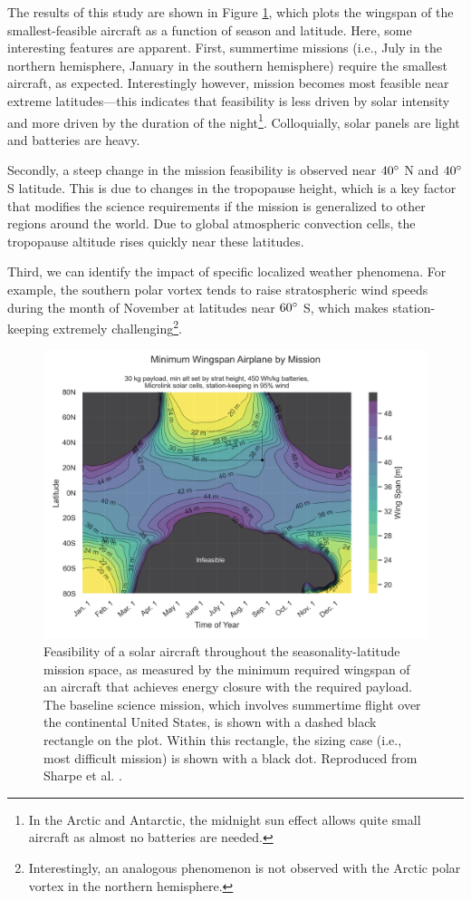 The results of this study are shown in Figure \ref{fig:dawn_wingspan}, which plots the wingspan of the smallest-feasible aircraft as a function of season and latitude. Here, some interesting features are apparent. First, summertime missions (i.e., July in the northern hemisphere, January in the southern hemisphere) require the smallest aircraft, as expected. Interestingly however, mission becomes most feasible near extreme latitudes—this indicates that feasibility is less driven by solar intensity and more driven by the duration of the night\footnote{In the Arctic and Antarctic, the midnight sun effect allows quite small aircraft as almost no batteries are needed.}. Colloquially, solar panels are light and batteries are heavy.

Secondly, a steep change in the mission feasibility is observed near $40\degree$ N and $40\degree$ S latitude. This is due to changes in the tropopause height, which is a key factor that modifies the science requirements if the mission is generalized to other regions around the world. Due to global atmospheric convection cells, the tropopause altitude rises quickly near these latitudes.

Third, we can identify the impact of specific localized weather phenomena. For example, the southern polar vortex tends to raise stratospheric wind speeds during the month of November at latitudes near $60\degree$ S, which makes station-keeping extremely challenging\footnote{Interestingly, an analogous phenomenon is not observed with the Arctic polar vortex in the northern hemisphere.}.

\begin{figure}[H]
    \centering
    \includegraphics[width=\textwidth]{../figures/dawnfigures/30kg_payloadw_mission.png}
    \caption{Feasibility of a solar aircraft throughout the seasonality-latitude mission space, as measured by the minimum required wingspan of an aircraft that achieves energy closure with the required payload. The baseline science mission, which involves summertime flight over the continental United States, is shown with a dashed black rectangle on the plot. Within this rectangle, the sizing case (i.e., most difficult mission) is shown with a black dot. Reproduced from Sharpe et al. \cite{sharpe_optimization_2021}.}
    \label{fig:dawn_wingspan}
\end{figure}

